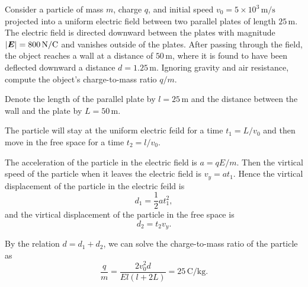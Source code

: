 \documentclass{article}
\begin{document}
\begin{problem}
Consider a particle of mass $m$, charge $q$, and initial speed $v_0 = 5 \times 10^3\,\mathrm{m/s}$ projected into a uniform electric field between two parallel plates of length $25\,\mathrm{m}$. The electric field is directed downward between the plates with magnitude $\left|\boldsymbol{E}\right| = 800\,\mathrm{N/C}$ and vanishes outside of the plates. After passing through the field, the object reaches a wall at a distance of $50\,\mathrm{m}$, where it is found to have been deflected downward a distance $d = 1.25\,\mathrm{m}$. Ignoring gravity and air resistance, compute the object's charge-to-mass ratio $q/m$.

\par\medskip
\begin{center}
\end{center}
\end{problem}

\begin{solution}
  Denote the length of the parallel plate by \( l=25\,\mathrm{m} \) and the distance between the wall and the plate by \( L=50\,\mathrm{m} \). \par
  The particle will stay at the uniform electric feild for a time \( t_1=L/v_0 \) and then move in the free space for a time \( t_2=l/v_0 \). \par
  The acceleration of the particle in the electric field is \( a=qE/m \). Then the virtical speed of the particle when it leaves the electric field is \( v_y=a t_1 \). Hence the virtical displacement of the particle in the electric feild is
  \[ d_1=\frac{1}{2}a t_1^2, \]
  and the virtical displacement of the particle in the free space is
  \[ d_2=t_2v_y. \]\par
  By the relation \( d=d_1+d_2 \), we can solve the charge-to-mass ratio of the particle as
  \[ \frac{q}{m}=\frac{2v_0^2d}{El(l+2L)}=25\,\mathrm{C/kg}. \]
\end{solution}
\end{document}
